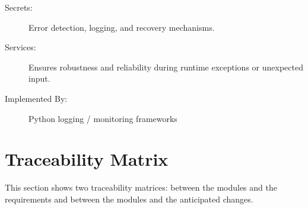 \documentclass[12pt, titlepage]{article}
\begin{document}
\begin{description}
\item[Secrets:] Error detection, logging, and recovery mechanisms.
\item[Services:] Ensures robustness and reliability during runtime exceptions or unexpected input.
\item[Implemented By:] Python logging / monitoring frameworks
\end{description}


\section{Traceability Matrix} \label{SecTM}

This section shows two traceability matrices: between the modules and the
requirements and between the modules and the anticipated changes.
\end{document}
